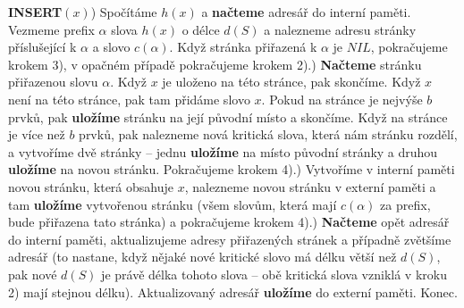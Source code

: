 \documentclass[a4paper,12pt]{article}
\begin{document}
{\bf INSERT$(x)$}) Spočítáme $h(x)$ a {\bf načteme} adresář do interní paměti. 
Vez\-me\-me prefix $\alpha$ slova $h(x)$ o délce $d(S)$ a nalezneme 
adresu stránky příslušející k $\alpha$ a slovo $
c(\alpha )$. 
Když stránka přiřazená k $\alpha$ je $NIL$, pokraču\-je\-me krokem 
3), v opačném případě pokraču\-je\-me krokem 2).) {\bf Načteme} stránku přiřazenou slovu $\alpha$. Když $
x$ je 
uloženo na této stránce, pak skončíme. Když $x$ není na 
této stránce, pak tam přidáme slovo $x$. Pokud na stránce 
je nejvýše $b$ prvků, pak {\bf uložíme} stránku 
na její původní místo a skončíme. Když na 
stránce je více než $b$ prvků, pak nalezneme nová 
kritická slova, 
která nám stránku rozdělí, a vytvoříme dvě stránky -- 
jednu {\bf uložíme} na místo původní stránky a 
druhou {\bf uložíme} na novou stránku. Pokračujeme krokem 
4).) Vytvoříme v interní paměti novou stránku, která 
obsahuje $x$, nalezneme novou stránku v externí paměti a 
tam {\bf uložíme} vytvořenou stránku (všem slovům, 
která mají $c(\alpha )$ za prefix, bude přiřazena tato stránka) a 
pokračujeme krokem 4).) {\bf Načteme} opět adresář do interní paměti, 
aktualizujeme adresy přiřazených stránek a případně 
zvětšíme adresář (to nastane, když nějaké nové kritické 
slovo má délku větší než $d(S)$, pak nové $d(S
)$ je právě 
délka tohoto slova -- obě kritická slova vzniklá v kroku 
2) mají stejnou délku). Aktualizovaný adresář {\bf uložíme} do 
externí paměti. Konec.
\end{document}
